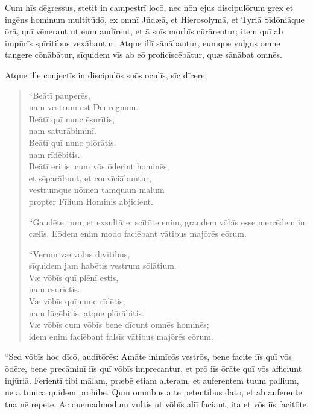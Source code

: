 \Versus Cum hīs dēgressus, stetit in campestrī locō, nec nōn ejus discipulōrum grex et ingēns hominum multitūdō, ex omnī Jūdæā, et Hierosolymā, et Tyriā Sīdōniāque ōrā, quī vēnerant ut eum audīrent, et ā suīs morbīs cūrārentur;
\Versus item quī ab impūrīs spīritibus vexābantur. Atque illī sānābantur,
\Versus eumque vulgus omne tangere cōnābātur, sīquidem vīs ab eō proficīscēbātur, quæ sānābat omnēs.

\Versus Atque ille conjectīs in discipulōs suōs oculīs, sīc dīcere:
\begin{verse}
\begin{patverse*}
``Beātī pauperēs,\\
nam vestrum est Deī rēgnum.\\
\Versus Beātī quī nunc ēsurītis,\\
nam saturābiminī.\\
Beātī quī nunc plōrātis,\\
nam rīdēbitis.\\
\Versus Beātī eritis, cum vōs ōderint hominēs,\\
et sēparābunt, et convīciābuntur,\\
vestrumque nōmen tamquam malum\\
propter Fīlium Hominis abjicient.

\Versus ``Gaudēte tum, et exsultāte; scītōte enim, grandem vōbīs esse mercēdem in cælīs. Eōdem enim modo faciēbant vātibus majōrēs eōrum.

\Versus ``Vērum væ vōbīs dīvitibus,\\
sīquidem jam habētis vestrum sōlātium.\\
\Versus Væ vōbīs quī plēnī estis,\\
nam ēsuriētis.\\
Væ vōbīs quī nunc rīdētis,\\
nam lūgēbitis, atque plōrābitis.\\
\Versus Væ vōbīs cum vōbīs bene dīcunt omnēs hominēs;\\
idem enim faciēbant falsīs vātibus majōrēs eōrum.
\end{patverse*}
\end{verse}

\Versus ``Sed vōbīs hoc dīcō, audītōrēs: Amāte inimīcōs vestrōs, bene facite iīs quī vōs ōdēre,
\Versus bene precāminī iīs quī vōbīs imprecantur, et prō iīs ōrāte quī vōs afficiunt injūriā.
\Versus Ferientī tibi mālam, præbē etiam alteram, et auferentem tuum pallium, nē ā tunicā quidem prohibē.
\Versus Quīn omnibus ā tē petentibus datō, et ab auferente tua nē repete.
\Versus Ac quemadmodum vultis ut vōbīs aliī faciant, ita et vōs iīs facitōte.

